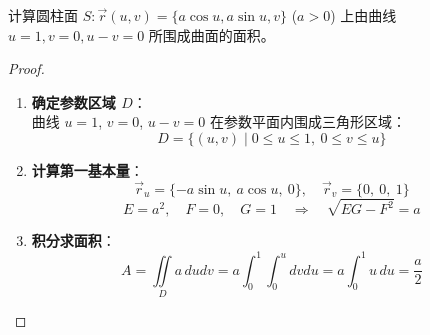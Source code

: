 \documentclass[lang=cn,10pt,thmcnt=section]{elegantbook}
\begin{document}
\begin{example}
	计算圆柱面 $S: \vec{r}(u,v) = \{a\cos u, a\sin u, v\}$ ($a > 0$) 上由曲线 $u=1, v=0, u-v=0$ 所围成曲面的面积。

\end{example}
\begin{proof}
	\begin{enumerate}
		\item \textbf{确定参数区域 $D$}：\\
		曲线 $u=1$, $v=0$, $u-v=0$ 在参数平面内围成三角形区域：
		\[
			D = \{(u,v) \mid 0 \leq u \leq 1,\ 0 \leq v \leq u\}
		\]
		
		\item \textbf{计算第一基本量}：
		\[
			\vec{r}_u = \{-a\sin u,\ a\cos u,\ 0\}, \quad 
			\vec{r}_v = \{0,\ 0,\ 1\}
		\]
		\[
			E = a^2, \quad F = 0, \quad G = 1 \quad \Rightarrow \quad \sqrt{EG - F^2} = a
		\]
		
		\item \textbf{积分求面积}：
		\[
			A = \iint\limits_{D} a \, du dv = a \int_{0}^{1} \int_{0}^{u} dv du = a \int_{0}^{1} u \, du = \boxed{\frac{a}{2}}
		\]
	\end{enumerate}
\end{proof}
\end{document}
